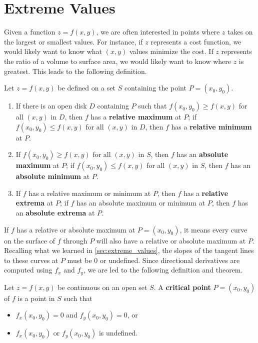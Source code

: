 \section{Extreme Values}\label{sec:multi_extreme_values}

Given a function $z=f(x,y)$, we are often interested in points where $z$ takes on the largest or smallest values. For instance, if $z$ represents a cost function, we would likely want to know what $(x,y)$ values minimize the cost. If $z$ represents the ratio of a volume to surface area, we would likely want to know where $z$ is greatest. This leads to the following definition.

{Let $z=f(x,y)$ be defined on a set $S$ containing the point $P=(x_0,y_0)$.
\begin{enumerate}
	\item If there is an open disk $D$ containing $P$ such that $f(x_0,y_0) \geq f(x,y)$ for all $(x,y)$ in $D$, then $f$ has a \textbf{relative maximum} at $P$; if $f(x_0,y_0) \leq f(x,y)$ for all $(x,y)$ in $D$, then $f$ has a \textbf{relative minimum} at $P$.
	
	\item	If $f(x_0,y_0)\geq f(x,y)$ for all $(x,y)$ in $S$, then $f$ has an \textbf{absolute maximum} at $P$; if $f(x_0,y_0)\leq f(x,y)$ for all $(x,y)$ in $S$, then $f$ has an \textbf{absolute minimum} at $P$.
	
	\item		If $f$ has a relative maximum or minimum at $P$, then $f$ has a \textbf{relative extrema} at $P$; if $f$ has an absolute maximum or minimum at $P$, then $f$ has an \textbf{absolute extrema} at $P$.
\end{enumerate}}

If $f$ has a relative or absolute maximum at $P=(x_0,y_0)$, it means every curve on the surface of $f$ through $P$ will also have a relative or absolute maximum at $P$. Recalling what we learned in \autoref{sec:extreme_values}, the slopes of the tangent lines to these curves at $P$ must be 0 or undefined. Since directional derivatives are computed using $f_x$ and $f_y$, we are led to the following definition and theorem.

{Let $z = f(x,y)$ be continuous on an open set $S$. A \textbf{critical point} $P=(x_0,y_0)$ of $f$ is a point in $S$ such that 
\begin{itemize}
	\item $f_x(x_0,y_0) = 0$ and $f_y(x_0,y_0) = 0$, or
	\item	$f_x(x_0,y_0)$ or $f_y(x_0,y_0)$ is undefined.
\end{itemize}}

